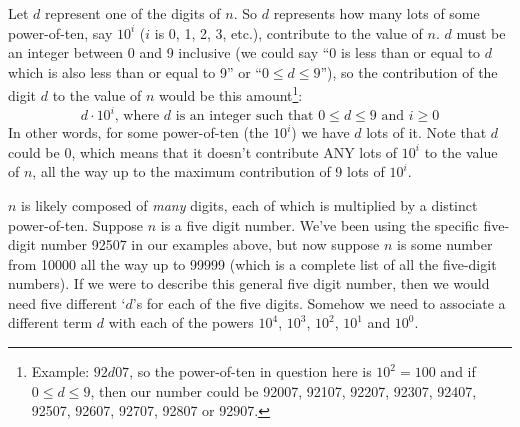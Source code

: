 \documentclass{article}
\begin{document}
Let $d$ represent one of the digits of $n$.
So $d$ represents how many lots of some power-of-ten,
say $10^i$  ($i$ is 0, 1, 2, 3, etc.),
contribute to the value of $n$.
$d$ must be an integer between 0 and 9
inclusive (we could say ``0 is less than or equal to $d$ which is also less than
or equal to 9'' or ``$0\le{}d\le9$''), so the contribution of
the digit $d$ to the value of $n$ would be this amount\footnote{Example:
$92d07$, so the power-of-ten in question here is $10^2=100$ and if $0\le{}d\le9$, then
our number could be
92007,
92107,
92207,
92307,
92407,
92507,
92607,
92707,
92807 or
92907.}:
\[d\cdot10^i\text{, where }d\text{ is an integer such
that }0\le{}d\le{}9\text{ and }i\ge{}0\]
In other words, for some power-of-ten (the $10^i$) we
have $d$ lots of it. Note that $d$
could be 0, which means that it doesn't contribute ANY
lots of $10^i$ to the value of $n$, all the way up to the maximum
contribution of 9 lots of $10^i$.

%
%
$n$ is likely composed of \emph{many} digits,
each of which is multiplied by a distinct power-of-ten.
Suppose $n$ is a five digit number.
We've been using the specific five-digit number 92507 in our examples above,
but now suppose $n$ is some number from 10000 all
the way up to 99999 (which is a complete list of all the five-digit numbers).
If we were to describe this general five digit number, then we would need
five different `$d$'s for each of the five digits.
Somehow we need to associate a different term $d$ with each of the powers
$10^4$, $10^3$, $10^2$, $10^1$ and $10^0$.
\end{document}
